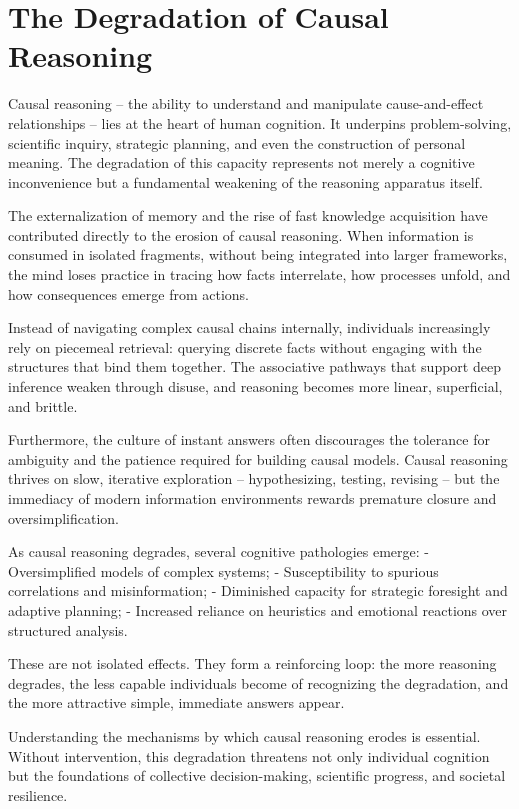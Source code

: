 \section{The Degradation of Causal Reasoning}

Causal reasoning -- the ability to understand and manipulate
cause-and-effect relationships -- lies at the heart of human cognition.
It underpins problem-solving, scientific inquiry, strategic planning,
and even the construction of personal meaning. The degradation of this
capacity represents not merely a cognitive inconvenience but a
fundamental weakening of the reasoning apparatus itself.

The externalization of memory and the rise of fast knowledge acquisition
have contributed directly to the erosion of causal reasoning. When
information is consumed in isolated fragments, without being integrated
into larger frameworks, the mind loses practice in tracing how facts
interrelate, how processes unfold, and how consequences emerge from
actions.

Instead of navigating complex causal chains internally, individuals
increasingly rely on piecemeal retrieval: querying discrete facts
without engaging with the structures that bind them together. The
associative pathways that support deep inference weaken through disuse,
and reasoning becomes more linear, superficial, and brittle.

Furthermore, the culture of instant answers often discourages the
tolerance for ambiguity and the patience required for building causal
models. Causal reasoning thrives on slow, iterative exploration --
hypothesizing, testing, revising -- but the immediacy of modern
information environments rewards premature closure and
oversimplification.

As causal reasoning degrades, several cognitive pathologies emerge: -
Oversimplified models of complex systems; - Susceptibility to spurious
correlations and misinformation; - Diminished capacity for strategic
foresight and adaptive planning; - Increased reliance on heuristics and
emotional reactions over structured analysis.

These are not isolated effects. They form a reinforcing loop: the more
reasoning degrades, the less capable individuals become of recognizing
the degradation, and the more attractive simple, immediate answers
appear.

Understanding the mechanisms by which causal reasoning erodes is
essential. Without intervention, this degradation threatens not only
individual cognition but the foundations of collective decision-making,
scientific progress, and societal resilience.



